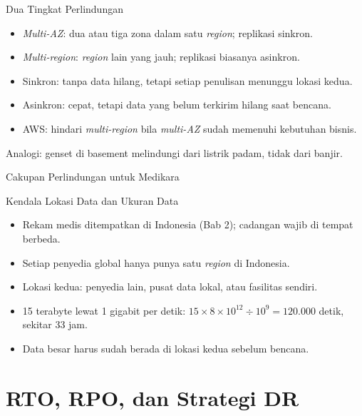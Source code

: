 \documentclass[aspectratio=169, table, 12pt]{beamer}
\begin{document}
\begin{frame}{{\Large Dua Tingkat Perlindungan}}
  \vspace{6pt}
  \small
  \begin{itemize}
    \item \textit{Multi-AZ}: dua atau tiga zona dalam satu \textit{region}; replikasi sinkron.
    \item \textit{Multi-region}: \textit{region} lain yang jauh; replikasi biasanya asinkron.
    \item Sinkron: tanpa data hilang, tetapi setiap penulisan menunggu lokasi kedua.
    \item Asinkron: cepat, tetapi data yang belum terkirim hilang saat bencana.
    \item AWS: hindari \textit{multi-region} bila \textit{multi-AZ} sudah memenuhi kebutuhan
          bisnis.
  \end{itemize}
  \vspace{4pt}
  {\small Analogi: genset di basement melindungi dari listrik padam, tidak dari banjir.}
\end{frame}

\begin{frame}{{\Large Cakupan Perlindungan untuk Medikara}}
  \centering
\end{frame}

\begin{frame}{{\Large Kendala Lokasi Data dan Ukuran Data}}
  \vspace{6pt}
  \small
  \begin{itemize}
    \item Rekam medis ditempatkan di Indonesia (Bab 2); cadangan wajib di tempat berbeda.
    \item Setiap penyedia global hanya punya satu \textit{region} di Indonesia.
    \item Lokasi kedua: penyedia lain, pusat data lokal, atau fasilitas sendiri.
    \item 15 terabyte lewat 1 gigabit per detik: $15 \times 8 \times 10^{12} \div 10^9 =
          120.000$ detik, sekitar 33 jam.
    \item Data besar harus sudah berada di lokasi kedua sebelum bencana.
  \end{itemize}
\end{frame}

\section{RTO, RPO, dan Strategi DR}
\end{document}
